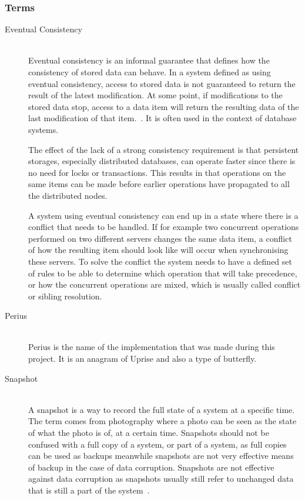 \documentclass[a4paper,12pt]{article}
\begin{document}
\subsubsection{Terms}
\begin{description}
\item[Eventual Consistency] \hfill \\
Eventual consistency is an informal guarantee that defines how the consistency of stored data can
behave. In a system defined as using eventual consistency, access to stored data is not guaranteed
to return the result of the latest modification. At some point, if modifications to the stored data
stop, access to a data item will return the resulting data of the last modification of that
item.~\cite{EVENTUAL}. It is often used in the context of database systems.

The effect of the lack of a strong consistency requirement is that persistent storages, especially
distributed databases, can operate faster since there is no need for locks or transactions.  This
results in that operations on the same items can be made before earlier operations have propagated
to all the distributed nodes.

A system using eventual consistency can end up in a state where there is a conflict that needs to be
handled. If for example two concurrent operations performed on two different servers changes the
same data item, a conflict of how the resulting item should look like will occur when synchronising
these servers. To solve the conflict the system needs to have a defined set of rules to be able to
determine which operation that will take precedence, or how the concurrent operations are mixed,
which is usually called conflict or sibling resolution. %

\item[Perius] \hfill \\
Perius is the name of the implementation that was made during this project. It is an anagram of
Uprise and also a type of butterfly.

\item[Snapshot] \hfill \\
A snapshot is a way to record the full state of a system at a specific time. The term comes from
photography where a photo can be seen as the state of what the photo is of, at a certain time.
Snapshots should not be confused with a full copy of a system, or part of a system, as full copies
can be used as backups meanwhile snapshots are not very effective means of backup in the case of
data corruption. Snapshots are not effective against data corruption as snapshots usually still
refer to unchanged data that is still a part of the system~\cite{SNAPSHOT}.

\end{description}
\newpage
\end{document}
